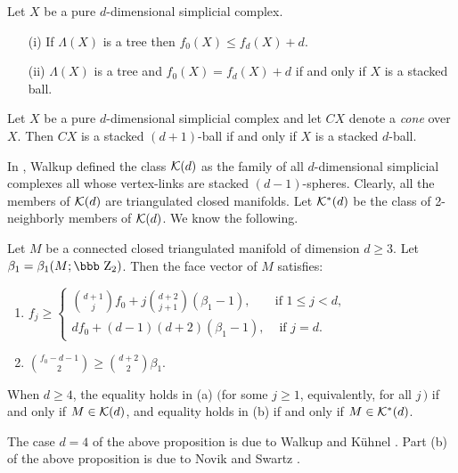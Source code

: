\documentclass[11pt]{article}
\newcommand{\ZZ}{\mbox{\bbb Z}} \newcommand{\N}{\mbox{I\!\!\!N}}
\begin{document}
\begin{prop}\label{prop:stackedball} Let $X$ be a pure
$d$-dimensional simplicial complex.  \begin{enumerate} \item[{\rm
(i)}] If $\Lambda(X)$ is a tree then $f_0(X) \leq f_d(X) +d$.
\item[{\rm (ii)}] $\Lambda(X)$ is a tree and $f_0(X) = f_d(X) +d$
if and only if $X$ is a stacked ball.  \end{enumerate}
\end{prop}

\begin{cor}\label{cor:C0} Let $X$ be a pure $d$-dimensional
simplicial complex and let $CX$ denote a {\em cone} over $X$.
Then $CX$ is a stacked $(d+1)$-ball if and only if $X$ is a
stacked $d$-ball.
\end{cor}

In \cite{wa}, Walkup defined the class ${\cal K}(d)$ as the family
of all $d$-dimensional simplicial complexes all whose vertex-links
are stacked $(d - 1)$-spheres. Clearly, all the members of ${\cal
K}(d)$ are triangulated closed manifolds. Let ${\cal K}^{\ast}(d)$
be the class of 2-neighborly members of  ${\cal K}(d)$. We know
the following.

\begin{prop}\label{P2}
Let $M$ be a connected closed triangulated manifold of dimension
$d\geq 3$. Let $\beta_1=\beta_1(M;\ZZ_{2})$. Then the face vector
of $M$ satisfies:
\begin{enumerate}[{\rm (a)}]
\item $ f_j \geq \begin{cases}
            \binom{d+1}{j}f_0+j\binom{d+2}{j+1}(\beta_1-1), & \mbox{
if } 1\leq j<d, \\
            df_0+(d-1)(d+2)(\beta_1-1), & \mbox{ if } j=d.
        \end{cases}
$

\item $\binom{f_0-d-1}{2}\geq \binom{d+2}{2}\beta_1$.
\end{enumerate}
When $d\geq 4$, the equality holds in {\rm (a)} $($for some $j
\geq 1$, equivalently, for all $j\,)$ if and only if $M\in {\cal
K}(d)$, and equality holds in {\rm (b)} if and only if $M\in
{\cal K}^{\ast}(d)$.
\end{prop}

The case $d=4$ of the above proposition is due to Walkup \cite{wa}
and K\"{u}hnel \cite{ku}. Part (b) of the above proposition is due
to Novik and Swartz \cite{NS}.
\end{document}

